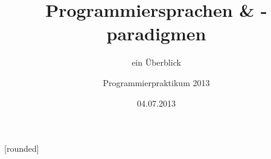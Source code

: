 \usepackage[ngerman]{babel}
\usepackage[utf8]{inputenc}
\usepackage{listings}

\usepackage{amsmath,amsfonts,amssymb}


\beamertemplatenavigationsymbolsempty

\title{Programmiersprachen \& -paradigmen}
\subtitle{ein Überblick}
\author[Sebastian Krings, Max Arendt, Alexander Schneider]{Programmierpraktikum 2013}
\date{04.07.2013}

\subject{}
\keywords{}


[rounded]

\usepackage{color}

\usepackage{listings}


\newcommand{\console}[1]{\begin{center}\colorbox{black}{\parbox{0.8\textwidth}{\textcolor{white}{#1}}}\end{center}}

